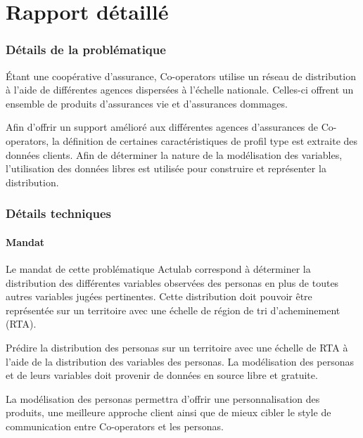 \documentclass[11pt,french]{article}\usepackage[]{graphicx}\usepackage[]{color}
\begin{document}
\newpage
\part{Rapport détaillé}

\section{Détails de la problématique}

Étant une coopérative d'assurance, Co-operators utilise un réseau de distribution à l'aide de différentes agences dispersées à l'échelle nationale. Celles-ci offrent un ensemble  de produits d'assurances vie et d'assurances dommages.
\newline

Afin d'offrir un support amélioré aux différentes agences d'assurances de Co-operators, la définition de certaines caractéristiques de profil type est extraite des données clients.  Afin de déterminer la nature de la modélisation des variables, l’utilisation des données libres est utilisée pour construire et représenter la distribution.

\section{Détails techniques}

\subsection*{Mandat}

Le mandat de cette problématique Actulab correspond à déterminer la distribution des différentes variables observées des personas en plus de toutes autres variables jugées pertinentes. Cette distribution doit pouvoir être représentée sur un territoire avec une échelle de région de tri d'acheminement (RTA).
\newline

Prédire la distribution des personas sur un territoire avec une échelle de RTA à l'aide de la distribution des variables des personas. La modélisation des personas et de leurs variables doit provenir de données en source libre et gratuite. 
\newline

La modélisation des personas permettra d'offrir une personnalisation des produits, une meilleure approche client ainsi que de mieux cibler le style de communication entre Co-operators et les personas.
\end{document}
